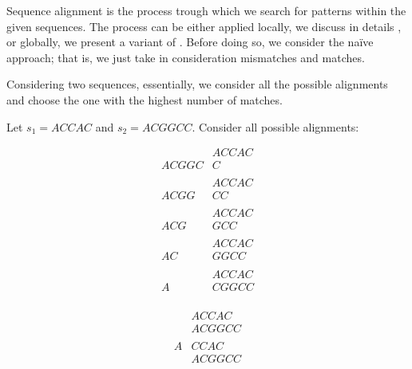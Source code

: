 \documentclass{subfiles}
\begin{document}
    Sequence alignment is the process trough which we search for patterns 
        within the given sequences. The process can be either applied locally,
        we discuss in details \cite{smith1981}, or globally, we present a variant of \cite{needleman1970}.
        Before doing so, we consider the na\"ive approach; that is, 
        we just take in consideration mismatches and matches. 

    Considering two sequences, essentially, we consider all the possible alignments 
        and choose the one with the highest number of matches.
        \begin{example*}
            Let \(s_{1} = ACCAC\) and \(s_{2} = ACGGCC\). Consider all possible alignments:
            {\setlength{\jot}{0pt}
            \begin{minipage}{0.45\textwidth} 
                \[\begin{aligned}
                    & ACCAC  \\
                    ACGGC &C \\
                    \\ 
                    & ACCAC  \\ 
                    ACGG &CC \\ 
                    \\ 
                    & ACCAC  \\ 
                    ACG &GCC \\ 
                    \\ 
                    & ACCAC  \\
                    AC &GGCC \\ 
                    \\ 
                    & ACCAC  \\ 
                    A &CGGCC \\
                \end{aligned}\]
            \end{minipage}
            \begin{minipage}{0.45\textwidth}
                \[\begin{aligned}
                    & ACCAC  \\
                    & ACGGCC \\
                    \\ 
                    A &CCAC  \\ 
                    & ACGGCC \\ 
                    \\ 

\end{aligned}\]
\end{minipage}}
\end{example*}
\end{document}
